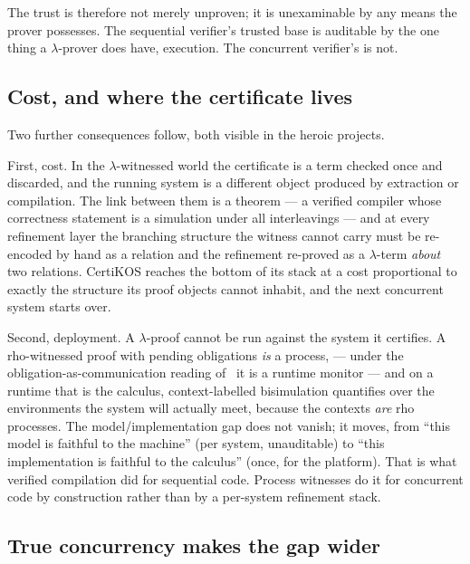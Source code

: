 \documentclass[11pt]{article}
\theoremstyle{plain}
\theoremstyle{definition}
\theoremstyle{remark}
\begin{document}
The trust is therefore not merely unproven; it is unexaminable by any means
the prover possesses. The sequential verifier's trusted base is auditable by
the one thing a $\lambda$-prover does have, execution. The concurrent
verifier's is not.

\subsection{Cost, and where the certificate lives}

Two further consequences follow, both visible in the heroic projects.

First, cost. In the $\lambda$-witnessed world the certificate is a term checked
once and discarded, and the running system is a different object produced by
extraction or compilation. The link between them is a theorem --- a verified
compiler whose correctness statement is a simulation under all interleavings
--- and at every refinement layer the branching structure the witness cannot
carry must be re-encoded by hand as a relation and the refinement re-proved as
a $\lambda$-term \emph{about} two relations. CertiKOS reaches the bottom of its
stack at a cost proportional to exactly the structure its proof objects cannot
inhabit, and the next concurrent system starts over.

Second, deployment. A $\lambda$-proof cannot be run against the system it
certifies. A rho-witnessed proof with pending obligations \emph{is} a process,
--- under the obligation-as-communication reading of~\cite{ProofSearch} it is a
runtime monitor --- and on a runtime that is the calculus, context-labelled
bisimulation quantifies over the environments the system will actually meet,
because the contexts \emph{are} rho processes. The model/implementation gap
does not vanish; it moves, from ``this model is faithful to the machine''
(per system, unauditable) to ``this implementation is faithful to the
calculus'' (once, for the platform). That is what verified compilation did for
sequential code. Process witnesses do it for concurrent code by construction
rather than by a per-system refinement stack.

\subsection{True concurrency makes the gap wider}
\end{document}

